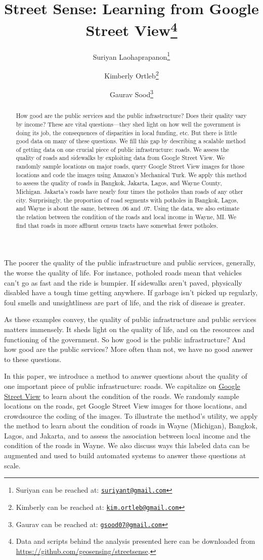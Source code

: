 \documentclass[12pt, letterpaper]{article}
\title{Street Sense: Learning from Google Street View\footnote{Data and scripts behind the analysis presented here can be downloaded from \url{https://github.com/geosensing/streetsense}.
}}
\author{Suriyan Laohaprapanon\thanks{Suriyan can be reached at: \href{mailto:suriyant@gmail.com}{\texttt{suriyant@gmail.com}}} \and Kimberly Ortleb\thanks{Kimberly can be reached at: \href{kim.ortleb@gmail.com}{\texttt{kim.ortleb@gmail.com}}} \and Gaurav Sood\thanks{Gaurav can be reached at: \href{gsood07@gmail.com}{\texttt{gsood07@gmail.com}}}}
\begin{document}
\maketitle
\thispagestyle{empty}

\begin{abstract}
How good are the public services and the public infrastructure? Does their quality vary by income? These are vital questions---they shed light on how well the government is doing its job, the consequences of disparities in local funding, etc. But there is little good data on many of these questions. We fill this gap by describing a scalable method of getting data on one crucial piece of public infrastructure: roads. We assess the quality of roads and sidewalks by exploiting data from Google Street View. We randomly sample locations on major roads, query Google Street View images for those locations and code the images using Amazon's Mechanical Turk. We apply this method to assess the quality of roads in Bangkok, Jakarta, Lagos, and Wayne County, Michigan. Jakarta's roads have nearly four times the potholes than roads of any other city. Surprisingly, the proportion of road segments with potholes in Bangkok, Lagos, and Wayne is about the same, between .06 and .07. Using the data, we also estimate the relation between the condition of the roads and local income in Wayne, MI. We find that roads in more affluent census tracts have somewhat fewer potholes.
\end{abstract}

\clearpage

\doublespacing

The poorer the quality of the public infrastructure and public services, generally, the worse the quality of life. For instance, potholed roads mean that vehicles can't go as fast and the ride is bumpier. If sidewalks aren't paved, physically disabled have a tough time getting anywhere. If garbage isn't picked up regularly, foul smells and unsightliness are part of life, and the risk of disease is greater.  

As these examples convey, the quality of public infrastructure and public services matters immensely. It sheds light on the quality of life, and on the resources and functioning of the government. So how good is the public infrastructure? And how good are the public services? More often than not, we have no good answer to these questions.

In this paper, we introduce a method to answer questions about the quality of one important piece of public infrastructure: roads. We capitalize on \href{https://www.google.com/streetview/}{Google Street View} to learn about the condition of the roads. We randomly sample locations on the roads, get Google Street View images for those locations, and crowdsource the coding of the images. To illustrate the method's utility, we apply the method to learn about the condition of roads in Wayne (Michigan), Bangkok, Lagos, and Jakarta, and to assess the association between local income and the condition of the roads in Wayne. We also discuss ways this labeled data can be augmented and used to build automated systems to answer these questions at scale.
\end{document}

